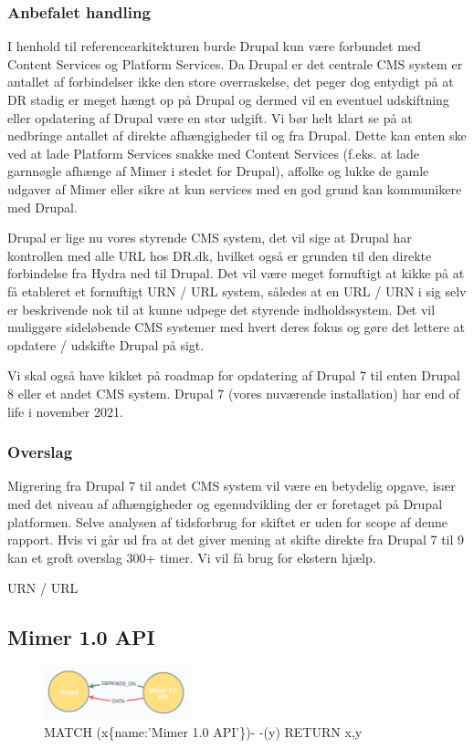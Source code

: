 \documentclass{article}
\begin{document}
\subsubsection{Anbefalet handling}
I henhold til referencearkitekturen burde Drupal kun være forbundet med Content Services og Platform Services. Da Drupal er det centrale CMS system er antallet af forbindelser ikke den store overraskelse, det peger dog entydigt på at DR stadig er meget hængt op på Drupal og dermed vil en eventuel udskiftning eller opdatering af Drupal være en stor udgift.
Vi bør helt klart se på at nedbringe antallet af direkte afhængigheder til og fra Drupal. 
Dette kan enten ske ved at lade Platform Services snakke med Content Services (f.eks. at lade garnnøgle afhænge af Mimer i stedet for Drupal), affolke og lukke de gamle udgaver af Mimer eller sikre at kun services med en god grund kan kommunikere med Drupal.

Drupal er lige nu vores styrende CMS system, det vil sige at Drupal har kontrollen med alle URL hos DR.dk, hvilket også er grunden til den direkte forbindelse fra Hydra ned til Drupal. Det vil være meget fornuftigt at kikke på at få etableret et fornuftigt URN / URL system, således at en URL / URN i sig selv er beskrivende nok til at kunne udpege det styrende indholdssystem. Det vil muliggøre sideløbende CMS systemer med hvert deres fokus og gøre det lettere at opdatere / udskifte Drupal på sigt.
 
Vi skal også have kikket på roadmap for opdatering af Drupal 7 til enten Drupal 8 eller et andet CMS system. Drupal 7 (vores nuværende installation) har end of life i november 2021.
\subsubsection{Overslag}
Migrering fra Drupal 7 til andet CMS system vil være en betydelig opgave, især med det niveau af afhængigheder og egenudvikling der er foretaget på Drupal platformen. 
Selve analysen af tidsforbrug for skiftet er uden for scope af denne rapport. Hvis vi går ud fra at det giver mening at skifte direkte fra Drupal 7 til 9 kan et groft overslag 300+ timer. Vi vil få brug for ekstern hjælp.

URN / URL 


\subsection{Mimer 1.0 API}
\begin{figure}[h]
\includegraphics[width=120pt]{MimerAPI.PNG}
\caption{MATCH (x\{name:'Mimer 1.0 API'\})- -(y) RETURN x,y}
\end{figure}
\end{document}
